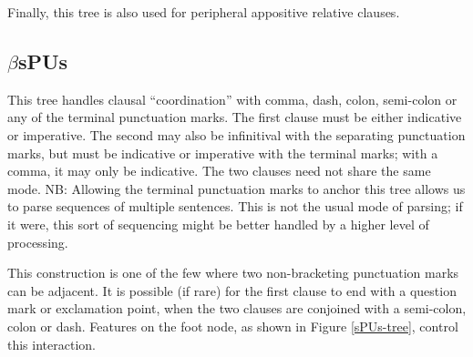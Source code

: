 Finally, this tree is also used for peripheral appositive relative 
clauses. 
 
\beginsentences
{}\label{ex:444} 
\endsentences

 
 
\subsection{$\beta$sPUs} 
\label{sPUs} 
 
This tree handles clausal ``coordination'' with comma, dash, colon, 
semi-colon or any of the terminal punctuation marks. The first clause 
must be either indicative or imperative. The second may also be 
infinitival with the separating punctuation marks, but must be 
indicative or imperative with the terminal marks; with a comma, it may 
only be indicative. The two clauses need not share the same mode. NB: 
Allowing the terminal punctuation marks to anchor this tree allows us 
to parse sequences of multiple sentences. This is not the usual mode 
of parsing; if it were, this sort of sequencing might be better 
handled by a higher level of processing. 
 
\beginsentences
{}\label{ex:445} 
\endsentences

 
\beginsentences
{}\label{ex:446} 
\endsentences

 
This construction is one of the few where two non-bracketing 
punctuation marks can be adjacent. It is possible (if rare) for the 
first clause to end with a question mark or exclamation point, when 
the two clauses are conjoined with a semi-colon, colon or 
dash. Features on the foot node, as shown in Figure \ref{sPUs-tree}, control 
this interaction. 
 
